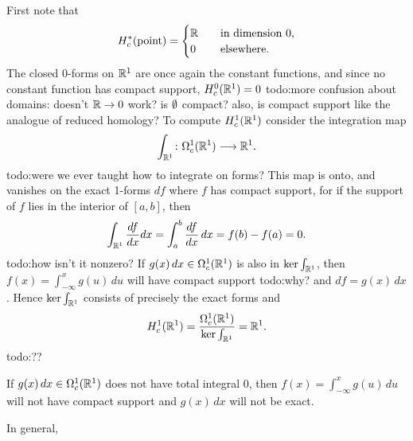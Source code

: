 \begin{example}
First note that 
\[
    H_c^*(\text{point} )=
\begin{cases}
    \mathbb{R}\quad & \text{in dimension}\ 0,\\
    0 & \text{elsewhere.} 
\end{cases}
\]The closed 0-forms on $\mathbb{R}^1$ are once again the constant functions, and since no constant function has compact support, $H^0_c(\mathbb{R}^1)=0$ {\color{red}todo:more confusion about domains: doesn't $\mathbb{R}\to 0$ work? is $\emptyset$ compact? also, is compact support like the analogue of reduced homology?}  To compute $H^1_c(\mathbb{R}^1)$ consider the integration map \[
\int _{\mathbb{R}^1} \colon \Omega^1_c(\mathbb{R}^1) \longrightarrow\mathbb{R}^1.
\] {\color{red}todo:were we ever taught how to integrate on forms?} This map is onto, and vanishes on the exact 1-forms $df$ where $f$ has compact support, for if the support of $f$ lies in the interior of $[a,b]$, then \[
\int_{\mathbb{R}^1} \frac{df}{dx}dx=\int_{a}^{b} \frac{df}{dx} \, dx=f(b)-f(a)=0.
\] {\color{red}todo:how isn't it nonzero?} If $g(x)\,dx \in \Omega_c^1(\mathbb{R}^1) $ is also in $\ker \int_{\mathbb{R}^1}$, then $f(x)=\int_{-\infty}^{x} g(u) \, du$ will have compact support {\color{red}todo:why?} and $df=g(x)\,dx$. Hence $\ker \int _{\mathbb{R}^1}$ consists of precisely the exact forms and \[
H_c^1(\mathbb{R}^1)= \frac{\Omega_c^1(\mathbb{R}^1)}{\ker \int _{\mathbb{R}^1}}=\mathbb{R}^1.
\] {\color{red}todo:??} 
\begin{remark}
    If $g(x)\, dx \in \Omega^1_c(\mathbb{R}^1)$ does not have total integral 0, then $f(x)= \int_{-\infty}^{x} g(u) \, du$ will not have compact support and $g(x)\,dx$ will not be exact.
\end{remark}In general, 
\end{example}
